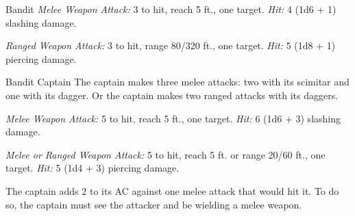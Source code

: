 \documentclass[10pt,a4paper,twoside,bg=print,twocolumn,openany,nodeprecatedcode]{dndbook}
\begin{document}
\begin{DndMonster}[float=t]{Bandit}
\DndMonsterBasics[
armor-class = {12 (\textit{leather armor})},
hit-points = {\DndDice{2d8 + 2}},
speed = {30 ft.}
]
\DndMonsterAbilityScores[
 str = 11,
 dex = 12,
 con = 12,
 int = 10,
 wis = 10,
 cha = 10
]
\DndMonsterDetails[
languages = {any one language (usually Common)},
challenge = 1/8,
]
\textsl{Melee Weapon Attack:} 3 to hit, reach 5 ft., one target. \textsl{Hit:} 4 (1d6 + 1) slashing damage.

\textsl{Ranged Weapon Attack:} 3 to hit, range 80/320 ft., one target. \textsl{Hit:} 5 (1d8 + 1) piercing damage.

\end{DndMonster}



\begin{DndMonster}[float=t]{Bandit Captain}
\DndMonsterBasics[
armor-class = {15 (studded leather armor)},
hit-points = {\DndDice{10d8 + 20}},
speed = {30 ft.}
]
\DndMonsterAbilityScores[
 str = 15,
 dex = 16,
 con = 14,
 int = 14,
 wis = 11,
 cha = 14
]
\DndMonsterDetails[
saving-throws = {Str +4, Dex +5, Wis +2},
skills = {Athletics +4, Deception +4},
languages = {any two languages},
challenge = 2,
]
The captain makes three melee attacks: two with its scimitar and one with its dagger. Or the captain makes two ranged attacks with its daggers.

\textsl{Melee Weapon Attack:} 5 to hit, reach 5 ft., one target. \textsl{Hit:} 6 (1d6 + 3) slashing damage.

\textsl{Melee or Ranged Weapon Attack:} 5 to hit, reach 5 ft. or range 20/60 ft., one target. \textsl{Hit:} 5 (1d4 + 3) piercing damage.

The captain adds 2 to its AC against one melee attack that would hit it. To do so, the captain must see the attacker and be wielding a melee weapon.

\end{DndMonster}
\end{document}
